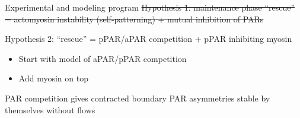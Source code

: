 \documentclass{beamer}
\newcommand{\6}[1]{#1_{\text{6}}}
\newcommand{\3}[1]{#1_{\text{3}}}
\newcommand{\lightgray}[1]{\color{lightgray}#1\normalcolor}
\begin{document}
\begin{frame}{Experimental and modeling program}
\lightgray{\st{Hypothesis 1: maintenance phase ``rescue'' = actomyosin instability (self-patterning) + mutual inhibition of PARs}}

\vspace{0.5 cm}

Hypothesis 2: ``rescue'' = pPAR/aPAR competition + pPAR inhibiting myosin 
\begin{itemize}
\item Start with model of aPAR/pPAR competition
\item \lightgray{Add myosin on top}
\end{itemize}
\end{frame}

\begin{frame}{PAR competition gives contracted boundary}
PAR asymmetries stable by themselves without flows


\end{frame}
\end{document}
